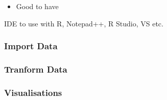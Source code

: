 \documentclass[
]{article}
\providecommand{\tightlist}{%
  \setlength{\itemsep}{0pt}\setlength{\parskip}{0pt}}
\begin{document}
\begin{itemize}
\tightlist
\item
  Good to have
\end{itemize}

IDE to use with R, Notepad++, R Studio, VS etc.

\hypertarget{import-data}{%
\subsubsection{Import Data}\label{import-data}}

\hypertarget{tranform-data}{%
\subsubsection{Tranform Data}\label{tranform-data}}

\hypertarget{visualisations}{%
\subsubsection{Visualisations}\label{visualisations}}
\end{document}
